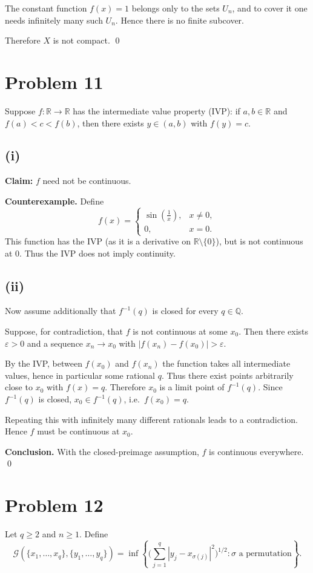 \documentclass[11pt,a4paper]{article}
\theoremstyle{definition}
\theoremstyle{definition}
\theoremstyle{plain}
\theoremstyle{remark}
\begin{document}
The constant function $f(x)=1$ belongs only to the sets $U_n$, and to cover it one needs infinitely many such $U_n$. Hence there is no finite subcover.  

Therefore $X$ is not compact.
\qed

\section*{Problem 11}
Suppose $f:\mathbb{R}\to\mathbb{R}$ has the intermediate value property (IVP): if $a,b\in\mathbb{R}$ and $f(a)<c<f(b)$, then there exists $y\in(a,b)$ with $f(y)=c$.

\subsection*{(i)}
\textbf{Claim:} $f$ need not be continuous.  

\textbf{Counterexample.} Define
\[
f(x)=\begin{cases}
	\sin\!\left(\tfrac{1}{x}\right), & x\neq 0,\\
	0, & x=0.
\end{cases}
\]
This function has the IVP (as it is a derivative on $\mathbb{R}\setminus\{0\}$), but is not continuous at $0$.  
Thus the IVP does not imply continuity.

\subsection*{(ii)}
Now assume additionally that $f^{-1}(q)$ is closed for every $q\in\mathbb{Q}$.  

Suppose, for contradiction, that $f$ is not continuous at some $x_0$.  
Then there exists $\varepsilon>0$ and a sequence $x_n\to x_0$ with $|f(x_n)-f(x_0)|>\varepsilon$.  

By the IVP, between $f(x_0)$ and $f(x_n)$ the function takes all intermediate values, hence in particular some rational $q$.  
Thus there exist points arbitrarily close to $x_0$ with $f(x)=q$.  
Therefore $x_0$ is a limit point of $f^{-1}(q)$.  
Since $f^{-1}(q)$ is closed, $x_0\in f^{-1}(q)$, i.e.\ $f(x_0)=q$.  

Repeating this with infinitely many different rationals leads to a contradiction.  
Hence $f$ must be continuous at $x_0$.  

\textbf{Conclusion.} With the closed-preimage assumption, $f$ is continuous everywhere.
\qed

\section*{Problem 12}
Let $q\geq 2$ and $n\geq 1$. Define
\[
\mathcal{G}(\{x_1,\dots,x_q\}, \{y_1,\dots,y_q\})
= \inf \left\{ \Big(\sum_{j=1}^q |y_j - x_{\sigma(j)}|^2 \Big)^{1/2} : \sigma \text{ a permutation} \right\}.
\]
\end{document}
